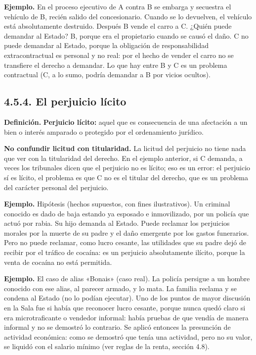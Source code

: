 \begin{ejemplo}
\textcolor[HTML]{4F6228}{\textbf{Ejemplo. }}En el proceso ejecutivo de A contra B se embarga y secuestra el vehículo de B, recién salido del concesionario. Cuando se lo devuelven, el vehículo está absolutamente destruido. Después B vende el carro a C. ¿Quién puede demandar al Estado? B, porque era el propietario cuando se causó el daño. C no puede demandar al Estado, porque la obligación de responsabilidad extracontractual es personal y no real: por el hecho de vender el carro no se transfiere el derecho a demandar. Lo que hay entre B y C es un problema contractual (C, a lo sumo, podría demandar a B por vicios ocultos).
\end{ejemplo}
\subsection{4.5.4. El perjuicio lícito}
\begin{definicion}
\textcolor[HTML]{1F3864}{\textbf{Definición. }}\textbf{Perjuicio lícito: }aquel que es consecuencia de una afectación a un bien o interés amparado o protegido por el ordenamiento jurídico.
\end{definicion}
\textbf{No confundir licitud con titularidad.} La licitud del perjuicio no tiene nada que ver con la titularidad del derecho. En el ejemplo anterior, si C demanda, a veces los tribunales dicen que el perjuicio no es lícito; eso es un error: el perjuicio sí es lícito, el problema es que C no es el titular del derecho, que es un problema del carácter personal del perjuicio.

\begin{ejemplo}
\textcolor[HTML]{4F6228}{\textbf{Ejemplo. }}Hipótesis (hechos supuestos, con fines ilustrativos). Un criminal conocido es dado de baja estando ya esposado e inmovilizado, por un policía que actuó por rabia. Su hijo demanda al Estado. Puede reclamar los perjuicios morales por la muerte de su padre y el daño emergente por los gastos funerarios. Pero no puede reclamar, como lucro cesante, las utilidades que su padre dejó de recibir por el tráfico de cocaína: es un perjuicio absolutamente ilícito, porque la venta de cocaína no está permitida.
\par
\textcolor[HTML]{4F6228}{\textbf{Ejemplo. }}El caso de alias «Bonais» (caso real). La policía persigue a un hombre conocido con ese alias, al parecer armado, y lo mata. La familia reclama y se condena al Estado (no lo podían ejecutar). Uno de los puntos de mayor discusión en la Sala fue si había que reconocer lucro cesante, porque nunca quedó claro si era microtraficante o vendedor informal: había pruebas de que vendía de manera informal y no se demostró lo contrario. Se aplicó entonces la presunción de actividad económica: como se demostró que tenía una actividad, pero no su valor, se liquidó con el salario mínimo (ver reglas de la renta, sección 4.8).
\end{ejemplo}
